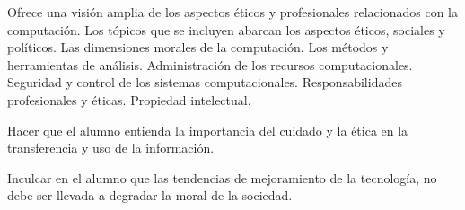 \begin{syllabus}


\begin{justification}
Ofrece una visión amplia de los aspectos éticos y profesionales relacionados con la computación. Los tópicos que se incluyen abarcan los aspectos éticos, sociales y políticos. Las dimensiones morales de la computación. Los métodos y herramientas de análisis. Administración de los recursos computacionales. Seguridad y control de los sistemas computacionales. Responsabilidades profesionales y éticas. Propiedad intelectual.
\end{justification}

\begin{goals}
\item Hacer que el alumno entienda la importancia del cuidado y la ética en la transferencia y uso de la información.
\item Inculcar en el alumno que las tendencias de mejoramiento de la tecnología, no debe ser llevada a degradar la moral de la sociedad.
\end{goals}

\begin{outcomes}
    \item {}%
    \item {}
    \item {}
    \item {}
\end{outcomes}

\begin{competences}
    \item {}
    \item {}
    \item {}
    \item {}
    \item {}
    \item {}
    \item {}
    \item {}
\end{competences}


\end{syllabus}
